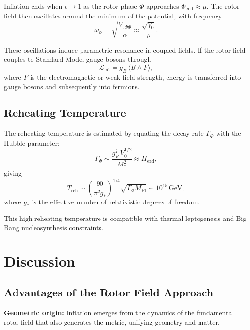 \documentclass[11pt,a4paper]{article}
\numberwithin{equation}{section}
\theoremstyle{plain}
\theoremstyle{definition}
\theoremstyle{remark}
\begin{document}
Inflation ends when $\epsilon \to 1$ as the rotor phase $\Phi$ approaches $\Phi_{\mathrm{end}} \approx \mu$. The rotor field then oscillates around the minimum of the potential, with frequency
\begin{equation}
\omega_{\Phi} = \sqrt{\frac{V_{,\Phi\Phi}}{\alpha}} \approx \frac{\sqrt{V_0}}{\mu}.
\end{equation}

These oscillations induce parametric resonance in coupled fields. If the rotor field couples to Standard Model gauge bosons through
\begin{equation}
\mathcal{L}_{\mathrm{int}} = g_B\,\langle B \wedge F \rangle,
\label{eq:coupling}
\end{equation}
where $F$ is the electromagnetic or weak field strength, energy is transferred into gauge bosons and subsequently into fermions.

\subsection{Reheating Temperature}

The reheating temperature is estimated by equating the decay rate $\Gamma_{\Phi}$ with the Hubble parameter:
\begin{equation}
\Gamma_{\Phi} \sim \frac{g_B^2\,V_0^{1/2}}{M_*^2} \approx H_{\mathrm{end}},
\end{equation}
giving
\begin{equation}
T_{\mathrm{reh}} \sim \left(\frac{90}{\pi^2 g_*}\right)^{1/4}\sqrt{\Gamma_{\Phi} M_{\mathrm{Pl}}} \sim 10^{15}\,\mathrm{GeV},
\label{eq:reheat-temp}
\end{equation}
where $g_*$ is the effective number of relativistic degrees of freedom.

This high reheating temperature is compatible with thermal leptogenesis and Big Bang nucleosynthesis constraints.

\section{Discussion}
\label{sec:discussion}

\subsection{Advantages of the Rotor Field Approach}

\textbf{Geometric origin:} Inflation emerges from the dynamics of the fundamental rotor field that also generates the metric, unifying geometry and matter.
\end{document}
